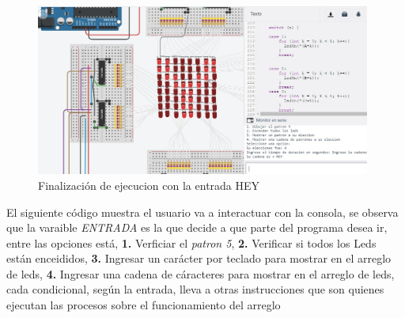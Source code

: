 \documentclass{article}
\begin{document}
       \begin{figure}[h]
    \includegraphics[width=11cm]{montaje7.jpeg}
    \centering
    \caption{Finalización de ejecucion con la entrada HEY}
    \label{ejecucionH}
    \end{figure}
    
    El siguiente código muestra el usuario va a interactuar con la consola, se observa que la varaible \textit{ENTRADA} es la que decide a que parte del programa desea ir, entre las opciones está, \textbf{1.} Verficiar el \textit{patron 5},\textbf{ 2.} Verificar si todos los Leds están enceididos,\textbf{ 3.} Ingresar un carácter por teclado para mostrar en el arreglo de leds,\textbf{ 4.} Ingresar una cadena de cáracteres para mostrar en  el arreglo de leds, cada condicional, según la entrada, lleva a otras instrucciones que son quienes ejecutan las procesos sobre el funcionamiento del arreglo\\
\end{document}
